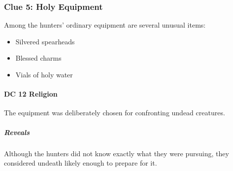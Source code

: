 \subsubsection*{Clue 5: Holy Equipment}
{\entryfont Among the hunters' ordinary equipment are several unusual items:
\begin{itemize}
	\item Silvered spearheads
	\item Blessed charms
	\item Vials of holy water
\end{itemize}

\paragraph*{DC 12 Religion} The equipment was deliberately chosen for confronting undead creatures.

\subparagraph{Reveals} Although the hunters did not know exactly what they were pursuing, they considered undeath likely enough to prepare for it.}

